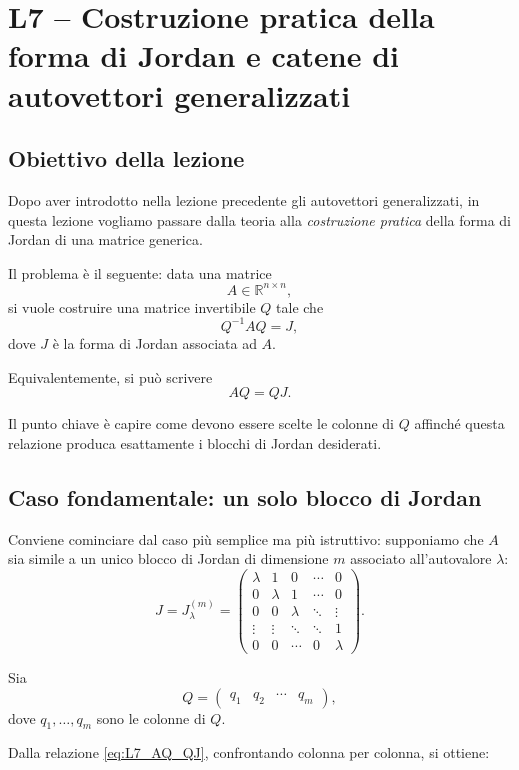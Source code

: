 \chapter{L7 -- Costruzione pratica della forma di Jordan e catene di autovettori generalizzati}

\section{Obiettivo della lezione}

Dopo aver introdotto nella lezione precedente gli autovettori generalizzati, in questa lezione vogliamo passare dalla teoria alla \emph{costruzione pratica} della forma di Jordan di una matrice generica.

Il problema è il seguente: data una matrice
\[
A\in\mathbb{R}^{n\times n},
\]
si vuole costruire una matrice invertibile $Q$ tale che
\[
Q^{-1}AQ=J,
\]
dove $J$ è la forma di Jordan associata ad $A$.

Equivalentemente, si può scrivere
\begin{equation}
AQ=QJ.
\label{eq:L7_AQ_QJ}
\end{equation}

Il punto chiave è capire come devono essere scelte le colonne di $Q$ affinché questa relazione produca esattamente i blocchi di Jordan desiderati.

\section{Caso fondamentale: un solo blocco di Jordan}

Conviene cominciare dal caso più semplice ma più istruttivo: supponiamo che $A$ sia simile a un unico blocco di Jordan di dimensione $m$ associato all'autovalore $\lambda$:
\[
J=
J_\lambda^{(m)}
=
\begin{pmatrix}
\lambda & 1 & 0 & \cdots & 0\\
0 & \lambda & 1 & \cdots & 0\\
0 & 0 & \lambda & \ddots & \vdots\\
\vdots & \vdots & \ddots & \ddots & 1\\
0 & 0 & \cdots & 0 & \lambda
\end{pmatrix}.
\]

Sia
\[
Q=\begin{pmatrix} q_1 & q_2 & \cdots & q_m \end{pmatrix},
\]
dove $q_1,\dots,q_m$ sono le colonne di $Q$.

Dalla relazione \eqref{eq:L7_AQ_QJ}, confrontando colonna per colonna, si ottiene:

